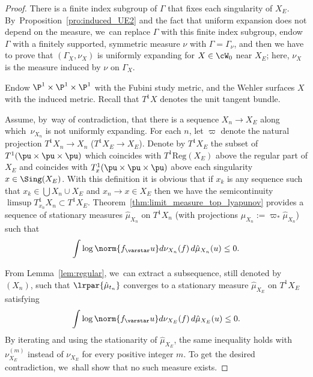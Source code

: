 \begin{proof}
There is a finite index subgroup of $\Gamma$ that
fixes each singularity of $X_E$. By~Proposition~\ref{pro:induced_UE2} and the fact that uniform expansion does not depend on the measure, we~can replace $\Gamma$ with this finite index subgroup, endow $\Gamma$ with a finitely supported, symmetric measure $\nu$ with $\Gamma=\Gamma_\nu$, and then we have to prove that $(\Gamma_X, \nu_X)$ is uniformly expanding for $X\in \cW_0$ near $X_E$; here, $\nu_X$ is the measure induced by $\nu$ on $\Gamma_X$.

Endow $\P^1\times \P^1\times \P^1$ with the Fubini study metric, and the Wehler surfaces $X$ with the induced metric. Recall that $T^1X$ denotes the unit tangent bundle.

Assume, by~way of contradiction, that there is a sequence
$X_n\to X_E$ along which~$\nu_{X_n}$ is not uniformly expanding.
For each $n$, let $\varpi$ denote the natural projection $T^1X_n\to X_n$ (\resp $T^1X_E\to X_E$).
Denote by $T^1X_E$ the subset of $T^1(\pu\times \pu\times \pu)$ which coincides with $T^1 \mathrm{Reg}(X_E)$ above the regular part of $X_E$ and coincides with $T^1_x(\pu\times \pu\times \pu)$ above each singularity $x\in \Sing(X_E)$. With this definition it is obvious that
if $x_k$ is any sequence such that $x_k\in \bigcup X_n\cup X_E$ and $x_n\to x\in X_E$
then we have the semicontinuity
$ \limsup T^1_{x_n}X_n\subset T^1X_E$. Theorem~\ref{thm:limit_measure_top_lyapunov}
provides a sequence of stationary measures $\hat \mu_{X_n}$ on $T^1X_n$ (with projections $\mu_{X_n}:=\varpi_*\hat\mu_{X_n}$) such that
\begin{equation*}
\int \log\norm{f_\varstar u} d\nu_{X_n}(f) \, d\hat \mu_{X_n} (u)\leq 0.
\end{equation*}

From Lemma~\ref{lem:regular}, we~can extract a subsequence, still denoted by $(X_n)$,
such that $\lrpar{\hat \mu_{t_n}}$ converges to a stationary measure $\hat \mu_{X_E}$ on $T^1X_E$ satisfying
\begin{equation*}
\int \log\norm{f_\varstar u} d\nu_{X_E}(f) \, d\hat \mu_{X_E} (u)\leq 0.
\end{equation*}
By iterating and using the stationarity of $\hat \mu_{X_E}$, the same inequality holds with $\nu_{X_E}^{(m)}$ instead of $\nu_{X_E}$ for every positive integer $m$. To get the desired contradiction, we~shall show that no such measure exists.


\end{proof}
